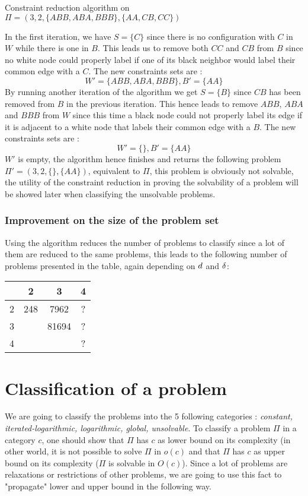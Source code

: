 \begin{exmp} Constraint reduction algorithm on $\Pi = (3, 2, \{ABB, ABA, BBB\}, \{AA, CB, CC\})$

In the first iteration, we have $S = \{C\}$ since there is no configuration with $C$ in $W$ while there is one in $B$.
This leads us to remove both $CC$ and $CB$ from $B$ since no white node could properly label if one of its black neighbor would label their common edge with a $C$.
The new constraints sets are :
$$W' = \{ABB, ABA, BBB\}, B' = \{AA\}$$
By running another iteration of the algorithm we get $S = \{B\}$ since $CB$ has been removed from $B$ in the previous iteration.
This hence leads to remove $ABB$, $ABA$ and $BBB$ from $W$ since this time a black node could not properly label its edge if it is adjacent to a white node that labels their common edge with a $B$.
The new constraints sets are :
$$W' = \{\}, B' = \{AA\}$$
$W'$ is empty, the algorithm hence finishes and returns the following problem $\Pi' = (3, 2,\{\}, \{AA\})$, equivalent to $\Pi$, this problem is obviously not solvable, the utility of the constraint reduction in proving the solvability of a problem will be showed later when classifying the unsolvable problems.
\end{exmp}
\subsubsection{Improvement on the size of the problem set}

Using the algorithm reduces the number of problems to classify since a lot of them are reduced to the same problems, this leads to the following number of problems presented in the table, again depending on $\wdd$ and $\bdd$:
\begin{center}
\begin{tabular}{ | c | c | c | c |}
 \hline
 \diagbox{$\wdd$}{$\bdd$} & 2 & 3 & 4 \\ 
 \hline
 2 & 248 & 7962 & ?\\
 \hline
 3 &  & 81694 & ?\\
 \hline
 4 &  &  &  ?\\
\hline
\end{tabular}
\end{center}


\section{Classification of a problem}
We are going to classify the problems into the 5 following categories : \textit{constant, iterated-logarithmic, logarithmic, global, unsolvable}. To classify a problem $\Pi$ in a category $c$, one should show that $\Pi$  has $c$ as lower bound on its complexity (in other world, it is not possible to solve $\Pi$ in $o(c)$ and that $\Pi$ has $c$ as upper bound on its complexity ($\Pi$ is solvable in $O(c)$). Since a lot of problems are relaxations or restrictions of other problems, we are going to use this fact to "propagate" lower and upper bound in the following way.
